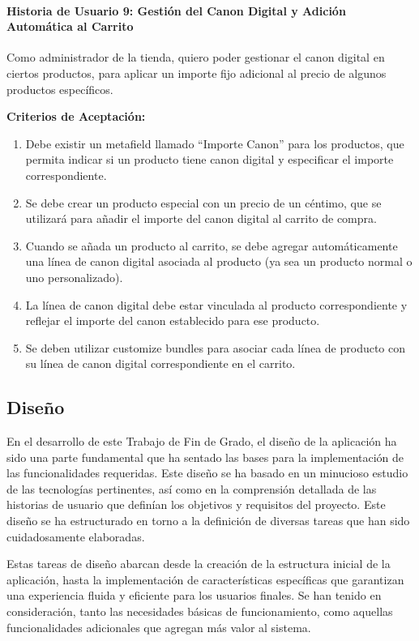 \documentclass[12pt]{article}
\newcommand{\subsubsubsection}[1]{\paragraph{#1}}
\begin{document}
\subsubsubsection{Historia de Usuario 9: Gestión del Canon Digital y Adición Automática al Carrito}\label{sec:historia9}

Como administrador de la tienda,
quiero poder gestionar el canon digital en ciertos productos,
para aplicar un importe fijo adicional al precio de algunos productos específicos.

\vspace{0.5cm}
\textbf{Criterios de Aceptación:}
\begin{enumerate}[label=\arabic*.]
    \item Debe existir un metafield llamado ``Importe Canon'' para los productos, que permita indicar si un producto tiene canon digital y especificar el importe correspondiente.
    \item Se debe crear un producto especial con un precio de un céntimo, que se utilizará para añadir el importe del canon digital al carrito de compra.
    \item Cuando se añada un producto al carrito, se debe agregar automáticamente una línea de canon digital asociada al producto (ya sea un producto normal o uno personalizado).
    \item La línea de canon digital debe estar vinculada al producto correspondiente y reflejar el importe del canon establecido para ese producto.
    \item Se deben utilizar customize bundles para asociar cada línea de producto con su línea de canon digital correspondiente en el carrito.
\end{enumerate}

\subsection{Diseño}
En el desarrollo de este Trabajo de Fin de Grado, el diseño de la aplicación ha sido una parte fundamental que ha sentado las bases para la implementación
de las funcionalidades requeridas. Este diseño se ha basado en un minucioso estudio de las tecnologías pertinentes, así como en la comprensión detallada de las
historias de usuario que definían los objetivos y requisitos del proyecto. Este diseño se ha estructurado en torno a la definición de diversas tareas que han sido cuidadosamente 
elaboradas.

Estas tareas de diseño abarcan desde la creación de la estructura inicial de la aplicación, hasta la implementación de características específicas que 
garantizan una experiencia fluida y eficiente para los usuarios finales. Se han tenido en consideración, tanto las necesidades básicas de funcionamiento, como aquellas funcionalidades
adicionales que agregan más valor al sistema.
\end{document}
